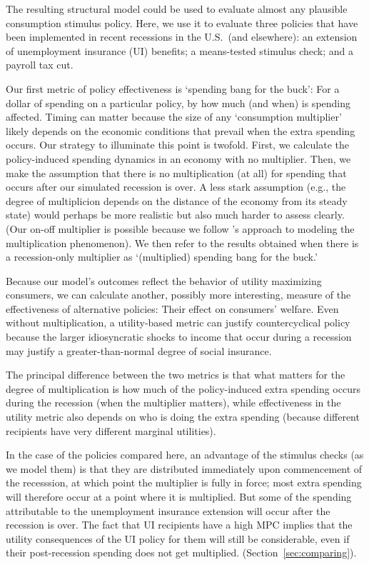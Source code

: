 \documentclass[../HAFiscal]{subfiles}
\begin{document}
The resulting structural model could be used to evaluate almost any plausible consumption stimulus policy.  Here, we use it to evaluate three policies that have been implemented in recent recessions in the U.S.\ (and elsewhere): an extension of unemployment insurance (UI) benefits; a means-tested stimulus check; and a payroll tax cut.

Our first metric of policy effectiveness is `spending bang for the buck': For a dollar of spending on a particular policy, by how much (and when) is spending affected.  Timing can matter because the size of any `consumption multiplier' likely depends on the economic conditions that prevail when the extra spending occurs.  Our strategy to illuminate this point is twofold.  First, we calculate the policy-induced spending dynamics in an economy with no multiplier.  Then, we make the assumption that there is no multiplication (at all) for spending that occurs after our simulated recession is over.  A less stark assumption (e.g., the degree of multiplicion depends on the distance of the economy from its steady state) would perhaps be more realistic but also much harder to assess clearly.  (Our on-off multiplier is possible because we follow \cite{kmpHandbook2016}'s approach to modeling the multiplication phenomenon).  We then refer to the results obtained when there is a recession-only multiplier as `(multiplied) spending bang for the buck.'

Because our model's outcomes reflect the behavior of utility maximizing consumers, we can calculate another, possibly more interesting, measure of the effectiveness of alternative policies:  Their effect on consumers' welfare.  Even without multiplication, a utility-based metric can justify countercyclical policy because the larger idiosyncratic shocks to income that occur during a recession may justify a greater-than-normal degree of social insurance.

The principal difference between the two metrics is that what matters for the degree of multiplication is how much of the policy-induced extra spending occurs during the recession (when the multiplier matters), while effectiveness in the utility metric also depends on who is doing the extra spending (because different recipients have very different marginal utilities).  

In the case of the policies compared here, an advantage of the stimulus checks (as we model them) is that they are distributed immediately upon commencement of the recesssion, at which point the multiplier is fully in force; most extra spending will therefore occur at a point where it is multiplied.  But some of the spending attributable to the unemployment insurance extension will occur after the recession is over.  The fact that UI recipients have a high MPC implies that the utility consequences of the UI policy for them will still be considerable, even if their post-recession spending does not get multiplied.  (Section~\ref{sec:comparing}).
\end{document}
